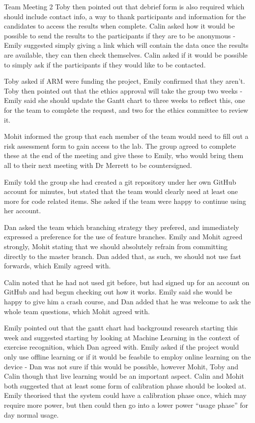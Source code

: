 \documentclass{article}
\begin{document}
\begin{Minutes}{Team Meeting 2}
Toby then pointed out that debrief form is also required which should include contact info, a way to thank
participants and information for the candidates to access the results when complete. Calin asked how it
would be possible to send the results to the participants if they are to be anonymous - Emily suggested
simply giving a link which will contain the data once the results are available, they can then check
themselves. Calin asked if it would be possible to simply ask if the participants if they would like to be
contacted.

Toby asked if ARM were funding the project, Emily confirmed that they aren't. Toby then pointed out that
the ethics approval will take the group two weeks - Emily said she should update the Gantt chart to three
weeks to reflect this, one for the team to complete the request, and two for the ethics committee to review
it.


Mohit informed the group that each member of the team would need to fill out a risk assessment form to gain
access to the lab. The group agreed to complete these at the end of the meeting and give these to Emily, who
would bring them all to their next meeting with Dr Merrett to be countersigned.


Emily told the group she had created a git repository under her own GitHub account for minutes, but stated
that the team would clearly need at least one more for code related items. She asked if the team were happy
to continue using her account.

Dan asked the team which branching strategy they prefered, and immediately expressed a preference for the
use of feature branches. Emily and Mohit agreed strongly, Mohit stating that we should absolutely refrain
from committing directly to the master branch. Dan added that, as such, we should not use fast forwards,
which Emily agreed with.

Calin noted that he had not used git before, but had signed up for an account on GitHub and had begun
checking out how it works. Emily said she would be happy to give him a crash course, and Dan added that
he was welcome to ask the whole team questions, which Mohit agreed with.


Emily pointed out that the gantt chart had background research starting this week and suggested starting
by looking at Machine Learning in the context of exercise recognition, which Dan agreed with. Emily asked
if the project would only use offline learning or if it would be feasbile to employ online learning on the
device - Dan was not sure if this would be possible, however Mohit, Toby and Calin though that live learning
would be an important aspect. Calin and Mohit both suggested that at least some form of calibration phase
should be looked at. Emily theorised that the system could have a calibration phase once, which may require
more power, but then could then go into a lower power ``usage phase'' for day normal usage.


\end{Minutes}
\end{document}
